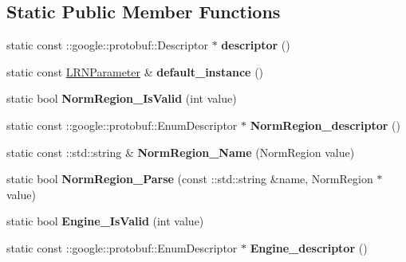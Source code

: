 \subsection*{Static Public Member Functions}
\begin{DoxyCompactItemize}
\item 
\mbox{\label{classcaffe_1_1_l_r_n_parameter_a59ca7fa0b2862bee335fab9e3f7ad707}} 
static const \+::google\+::protobuf\+::\+Descriptor $\ast$ {\bfseries descriptor} ()
\item 
\mbox{\label{classcaffe_1_1_l_r_n_parameter_a791f256ba22ab73585827d5588b08c13}} 
static const \mbox{\hyperlink{classcaffe_1_1_l_r_n_parameter}{L\+R\+N\+Parameter}} \& {\bfseries default\+\_\+instance} ()
\item 
\mbox{\label{classcaffe_1_1_l_r_n_parameter_abc572ecb59d920e16e1cea5c410784f6}} 
static bool {\bfseries Norm\+Region\+\_\+\+Is\+Valid} (int value)
\item 
\mbox{\label{classcaffe_1_1_l_r_n_parameter_a26b11f627a561e209a47add19f6d00d8}} 
static const \+::google\+::protobuf\+::\+Enum\+Descriptor $\ast$ {\bfseries Norm\+Region\+\_\+descriptor} ()
\item 
\mbox{\label{classcaffe_1_1_l_r_n_parameter_a1ee8ed9d9a6442706c3b36afe0beb695}} 
static const \+::std\+::string \& {\bfseries Norm\+Region\+\_\+\+Name} (Norm\+Region value)
\item 
\mbox{\label{classcaffe_1_1_l_r_n_parameter_aced9ae2ab7372f962a38df6958d69122}} 
static bool {\bfseries Norm\+Region\+\_\+\+Parse} (const \+::std\+::string \&name, Norm\+Region $\ast$value)
\item 
\mbox{\label{classcaffe_1_1_l_r_n_parameter_adca62a7c5ef42b256d9845737f87616d}} 
static bool {\bfseries Engine\+\_\+\+Is\+Valid} (int value)
\item 
\mbox{\label{classcaffe_1_1_l_r_n_parameter_aec48917cd38faf59905172de966f5664}} 
static const \+::google\+::protobuf\+::\+Enum\+Descriptor $\ast$ {\bfseries Engine\+\_\+descriptor} ()

\end{DoxyCompactItemize}
